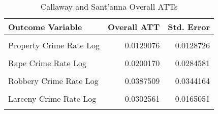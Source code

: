 \begin{table}[H]

\caption{\label{tab:tab:cs}Callaway and Sant'anna Overall ATTs}
\centering
\begin{tabular}[t]{lrr}
\toprule
Outcome Variable & Overall ATT & Std. Error\\
\midrule
\cellcolor{gray!6}{Violent Crime Rate Log} & \cellcolor{gray!6}{-0.0099595} & \cellcolor{gray!6}{0.0259180}\\
Property Crime Rate Log & 0.0129076 & 0.0128726\\
\cellcolor{gray!6}{Murder Crime Rate Log} & \cellcolor{gray!6}{-0.0485681} & \cellcolor{gray!6}{0.0266759}\\
Rape Crime Rate Log & 0.0200170 & 0.0284581\\
\cellcolor{gray!6}{Assault Crime Rate Log} & \cellcolor{gray!6}{0.0048334} & \cellcolor{gray!6}{0.0444671}\\
\addlinespace
Robbery Crime Rate Log & 0.0387509 & 0.0344164\\
\cellcolor{gray!6}{Burglary Crime Rate Log} & \cellcolor{gray!6}{-0.0157512} & \cellcolor{gray!6}{0.0161027}\\
Larceny Crime Rate Log & 0.0302561 & 0.0165051\\
\cellcolor{gray!6}{Autotheft Crime Rate Log} & \cellcolor{gray!6}{0.0107402} & \cellcolor{gray!6}{0.0427668}\\
\bottomrule
\end{tabular}
\end{table}
